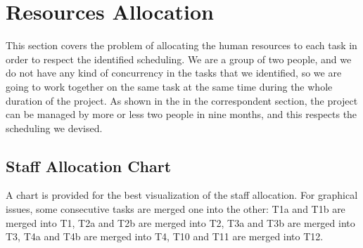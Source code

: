 \section{Resources Allocation}
This section covers the problem of allocating the human resources to each task in order to respect the identified scheduling.
We are a group of two people, and we do not have any kind of concurrency in the tasks that we identified, so we are going to work together on the same task at the same time during the whole duration of the project.
As shown in the  in the correspondent section, the project can be managed by more or less two people in nine months, and this respects the scheduling we devised.
%
\subsection{Staff Allocation Chart}
A chart is provided for the best visualization of the staff allocation.
For graphical issues, some consecutive tasks are merged one into the other: T1a and T1b are merged into T1, T2a and T2b are merged into T2, T3a and T3b are merged into T3, T4a and T4b are merged into T4, T10 and T11 are merged into T12.
\begin{center}
	\begin{ganttchart}[hgrid=true, x unit=2.3mm]{1}{44}
		 \\
		\\
\end{ganttchart}
\end{center}
%